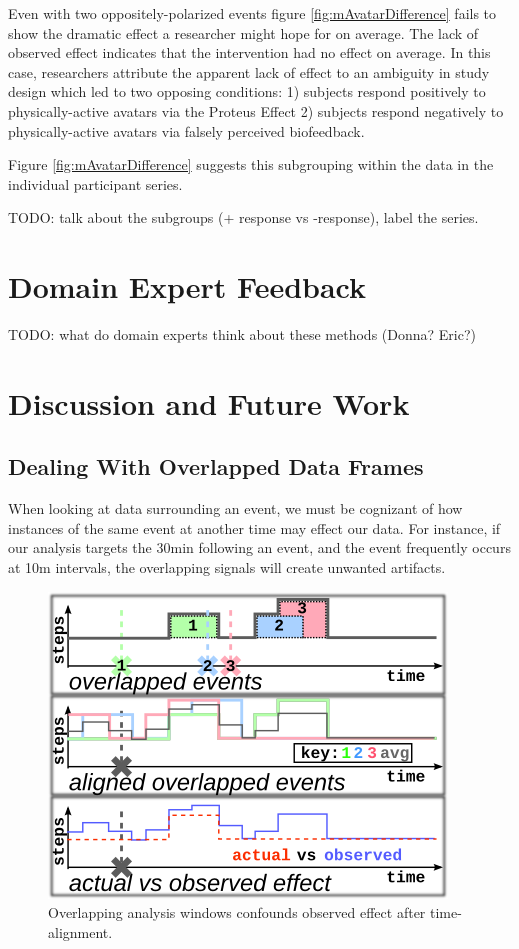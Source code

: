 \documentclass[review,journal]{vgtc}         %
\begin{document}
Even with two oppositely-polarized events figure \ref{fig:mAvatarDifference} fails to show the dramatic effect a researcher might hope for on average.
The lack of observed effect indicates that the intervention had no effect on average.
In this case, researchers attribute the apparent lack of effect to an ambiguity in study design which led to two opposing conditions: 1) subjects respond positively to physically-active avatars via the Proteus Effect \cite{???} 2) subjects respond negatively to physically-active avatars via falsely perceived biofeedback.

Figure \ref{fig:mAvatarDifference} suggests this subgrouping within the data in the individual participant series.

TODO: talk about the subgroups (+ response vs -response), label the series.

\section{Domain Expert Feedback}
TODO: what do domain experts think about these methods (Donna? Eric?)

\section{Discussion and Future Work}

\subsection{Dealing With Overlapped Data Frames}
When looking at data surrounding an event, we must be cognizant of how instances of the same event at another time may effect our data.
For instance, if our analysis targets the 30min following an event, and the event frequently occurs at 10m intervals, the overlapping signals will create unwanted artifacts.

\begin{figure}
\centering
\includegraphics[width=0.9\columnwidth]{./img/eventOverlapExample.png}
\caption{Overlapping analysis windows confounds observed effect after time-alignment.}
\label{fig:overlapExample}
\end{figure}
\end{document}
